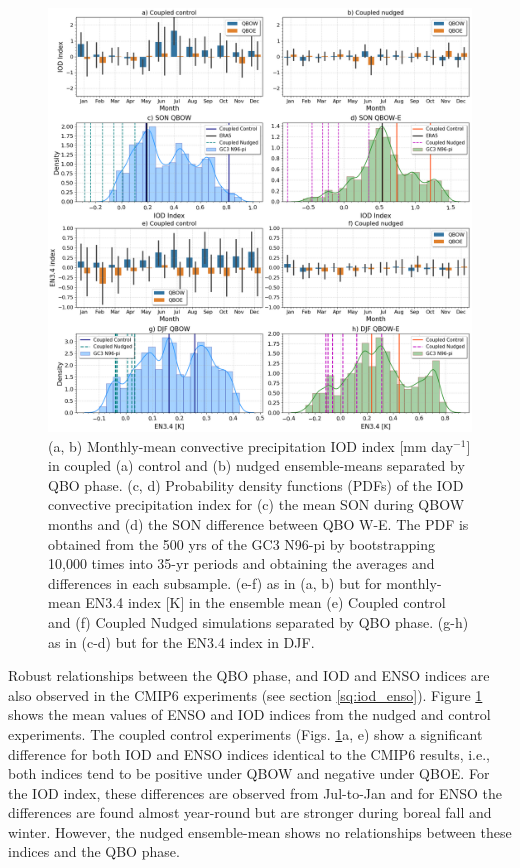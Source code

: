 \begin{figure}[t!]
\centering
 \includegraphics[width=0.97\linewidth]{figures/iod_suites.png}
\caption[IOD and ENSO indices in nudged versus control experiments]{(a, b) Monthly-mean convective precipitation IOD index [mm day$^{-1}$] in coupled (a) control and (b) nudged ensemble-means separated by QBO phase. (c, d) Probability density functions (PDFs) of the IOD convective precipitation index for (c) the mean SON during QBOW months and (d) the SON difference between QBO W-E. The PDF is obtained from the 500 yrs of the GC3 N96-pi by bootstrapping 10,000 times into 35-yr periods and obtaining the averages and differences in each subsample. (e-f) as in (a, b) but for monthly-mean EN3.4 index [K] in the ensemble mean (e) Coupled control and (f) Coupled Nudged simulations separated by QBO phase. (g-h) as in (c-d) but for the EN3.4 index in DJF. }
\label{fig:iod_suites}
\end{figure}

Robust relationships between the QBO phase, and IOD and ENSO indices are also observed in the CMIP6 experiments  (see section \ref{sq:iod_enso}). Figure \ref{fig:iod_suites} shows the mean values of ENSO 
and IOD indices from the nudged and control experiments. The coupled control experiments (Figs. \ref{fig:iod_suites}a, e) show a significant difference for both IOD and ENSO indices identical to the CMIP6 results, i.e., both indices tend to be positive under QBOW and negative under QBOE. For the IOD index, these differences are observed from Jul-to-Jan and for ENSO the differences are found almost year-round but are stronger during boreal fall and winter. However, the nudged ensemble-mean shows no relationships between these indices and the QBO phase. 

